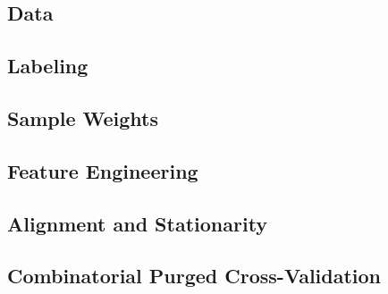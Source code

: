\documentclass[12pt,a4paper,oneside]{article}
\begin{document}
\subsection{Data}\label{subsec:data}



\subsection{Labeling}\label{subsec:labeling}



\subsection{Sample Weights}\label{subsec:weights}



\subsection{Feature Engineering}\label{subsec:features}



\subsection{Alignment and Stationarity}\label{subsec:alignment}



\subsection{Combinatorial Purged Cross-Validation}\label{subsec:cpcv}

\end{document}

